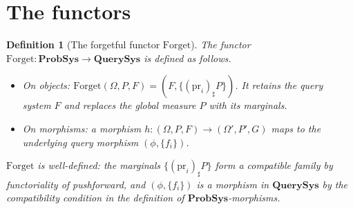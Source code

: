 \documentclass[11pt]{article}
\newtheorem{definition}{Definition}
\newcommand{\QSys}{\mathbf{QuerySys}}
\newcommand{\PSys}{\mathbf{ProbSys}}
\newcommand{\pr}{\mathrm{pr}}
\newcommand{\Forget}{\mathrm{Forget}}
\newcommand{\sharppush}{_\sharp}
\begin{document}
\section{The functors}
\label{sec:functors}

\begin{definition}[The forgetful functor $\Forget$]\label{def:forget}
The functor $\Forget : \PSys \to \QSys$ is defined as follows.
\begin{itemize}
  \item \emph{On objects}: $\Forget(\Omega, P, F) = (F, \{(\pr_i)\sharppush P\})$.
    It retains the query system $F$ and replaces the global measure $P$ with
    its marginals.
  \item \emph{On morphisms}: a morphism $h : (\Omega, P, F) \to (\Omega', P', G)$
    maps to the underlying query morphism $(\phi, \{f_i\})$.
\end{itemize}
$\Forget$ is well-defined: the marginals $\{(\pr_i)\sharppush P\}$ form a
compatible family by functoriality of pushforward, and $(\phi, \{f_i\})$
is a morphism in $\QSys$ by the compatibility condition in the definition
of $\PSys$-morphisms.
\end{definition}
\end{document}
